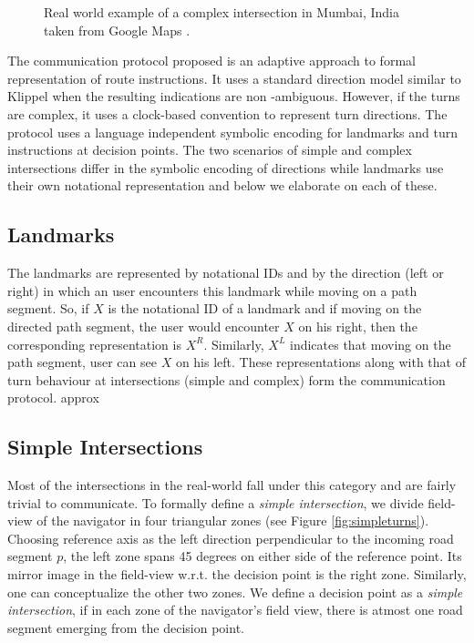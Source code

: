 \documentclass{iitkthesis}
\begin{document}
 \begin{figure}[htb]
\centering
\caption{Real world example of a complex intersection in Mumbai, India 
taken from Google Maps \cite{gmaps}.}
\label{fig:complex_real}
 \end{figure}

The communication protocol proposed is an adaptive approach to formal 
representation of route instructions. It uses a standard direction model 
similar to Klippel \cite{klippel} when the resulting indications are non
-ambiguous. However, if the turns are complex, it uses a clock-based 
convention to represent turn directions. The protocol uses a language 
independent symbolic encoding for landmarks and turn instructions at 
decision points. The two scenarios of simple and complex intersections 
differ in the symbolic encoding of directions while landmarks use their own 
notational representation and below we elaborate on each of these. 

\subsection{Landmarks}
The landmarks are represented by notational IDs and by the direction 
(left or right) in which an user encounters this landmark while moving on 
a path segment. So, if $X$ is the notational ID of a landmark and if 
moving on the directed path segment, the user would encounter $X$ on his 
right, then the corresponding representation is $X^R$. Similarly, $X^L$ 
indicates that moving on the path segment, user can see $X$ on his left. 
These representations along with that of turn behaviour at intersections 
(simple and complex) form the communication protocol. approx

\subsection{Simple Intersections}
Most of the intersections in the real-world fall under this category and 
are fairly trivial to communicate. To formally define a \textit{simple 
intersection}, we divide field-view of the navigator in four triangular 
zones (see Figure \ref{fig:simpleturns}). Choosing reference axis as the 
left direction perpendicular to the incoming road segment $p$, the left 
zone spans 45 degrees on either side of the reference point. Its mirror 
image in the field-view w.r.t. the decision point is the right zone. 
Similarly, one can conceptualize the other two zones. We define a 
decision point as a \textit{simple intersection}, if in each zone of the 
navigator's field view, there is atmost one road segment emerging from 
the decision point. 
\end{document}
